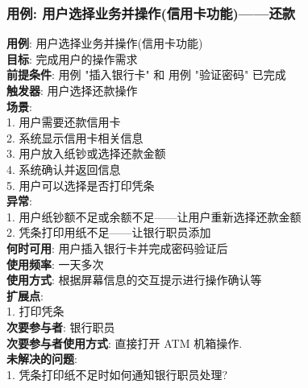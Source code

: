 \documentclass[UTF8]{article}
\begin{document}
\subsubsection{用例: 用户选择业务并操作(信用卡功能)——还款}
\noindent
\textbf{用例}: 用户选择业务并操作(信用卡功能)
\\
\textbf{目标}: 完成用户的操作需求
\\
\textbf{前提条件}: 用例 "插入银行卡" 和 用例 "验证密码" 已完成
\\
\textbf{触发器}: 用户选择还款操作
\\
\textbf{场景}: \\
	\hspace*{2em} 1. 用户需要还款信用卡 \\
	\hspace*{2em} 2. 系统显示信用卡相关信息 \\
	\hspace*{2em} 3. 用户放入纸钞或选择还款金额 \\
	\hspace*{2em} 4. 系统确认并返回信息 \\
	\hspace*{2em} 5. 用户可以选择是否打印凭条 \\
	
\textbf{异常}: \\
	\hspace*{2em} 1. 用户纸钞额不足或余额不足——让用户重新选择还款金额 \\
	\hspace*{2em} 2. 凭条打印用纸不足——让银行职员添加 \\
\textbf{何时可用}: 用户插入银行卡并完成密码验证后
\\
\textbf{使用频率}: 一天多次
\\
\textbf{使用方式}: 根据屏幕信息的交互提示进行操作确认等 \\
\textbf{扩展点}: \\
	\hspace*{2em}1. 打印凭条 \\
\textbf{次要参与者}: 银行职员
\\
\textbf{次要参与者使用方式}: 直接打开 ATM 机箱操作.
\\
\textbf{未解决的问题}: \\
	\hspace*{2em} 1. 凭条打印纸不足时如何通知银行职员处理? \\
			
			
\end{document}
